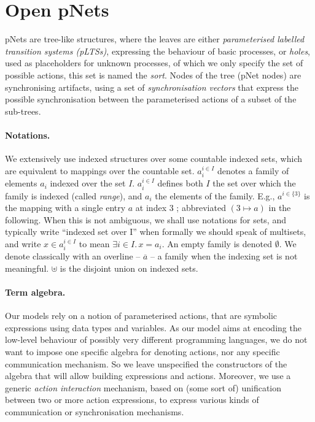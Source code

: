 \documentclass{llncs}
\newcommand{\todoLHin}[2][inline,color=blue!40]{\todo[#1]{\textbf{To-do Ludo: } {#2}}}
\begin{document}

\section{Open pNets}
\label{secn:pNets}
\todoLHin{rewrite after uniformisation}
pNets are tree-like structures, where the leaves are either
\emph{parameterised labelled transition systems (pLTSs)}, expressing the
behaviour of basic processes, or \emph{holes}, used as placeholders
for unknown processes, of which we only specify the set of possible
actions, this set is named the \emph{sort}.
Nodes of the tree (pNet nodes) are synchronising artifacts, using a
set of \emph{synchronisation vectors} that express the possible
synchronisation between the parameterised actions of a subset of the
sub-trees.


\paragraph*{Notations.}
We extensively use indexed structures
over some countable indexed sets, which are equivalent to mappings over
the countable set. %
$a_i^{i\in I}$
denotes a family of elements $a_i$ indexed over the
set $I$. %
$a_i^{i\in I}$ defines both $I$ the set over which the family is
indexed (called \emph{range}), and $a_i$ the elements of the family.
E.g., $a^{i\in\{3\}}$ is the mapping with a single entry $a$ at index
$3$ ; abbreviated $(3\mapsto a)$ in the following.
When this is not
ambiguous, we shall use notations for sets, and typically write
``indexed set over I'' when formally we should speak of multisets, and
write $x\in a_i^{i\in I}$ to mean $\exists i\in I.\, x=a_i$.  An empty
family is denoted $\emptyset$. We
denote classically with an overline -- $\overline{a}$  -- a family when the indexing set 
is
not meaningful.  $\uplus$ is the disjoint union on
indexed sets.

\paragraph*{Term algebra.}
Our models rely on a notion of parameterised actions, that are
symbolic expressions using data types and variables. As our model aims
at encoding the low-level behaviour of possibly very different
programming languages, we do not want to impose one specific algebra
for denoting actions, nor any specific communication mechanism. So we
leave unspecified the constructors of the algebra that will allow building
expressions and actions. Moreover, we use a generic {\em action interaction}
mechanism, based on (some sort of) unification between two or more action
expressions, to express various kinds of communication or
synchronisation mechanisms.
\end{document}
